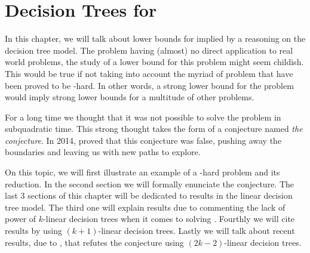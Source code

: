 \chapter{Decision Trees for \threeSUM}

In this chapter, we will talk about lower bounds for \threeSUM implied by
a reasoning on the decision tree model. The \threeSUM problem having (almost) no
direct application to real world problems, the study of a lower bound for this
problem might seem childish. This would be true if not taking into
account the myriad of problem that have been proved to be \threeSUM-hard. In
other words, a strong lower bound for the \threeSUM problem would imply strong
lower bounds for a multitude of other problems.

For a long time we thought that it was not possible to solve the \threeSUM
problem in subquadratic time. This strong thought takes the form of a
conjecture named \emph{the \threeSUM conjecture}. In 2014, \citet*{gronlund:2014}
proved that this conjecture was false, pushing away the
boundaries and leaving us with new paths to explore.

On this topic, we will first illustrate an example of a \threeSUM-hard problem
and its reduction. In the second section we will formally enunciate the
\threeSUM conjecture. The last 3 sections of this chapter will be dedicated to results
in the linear decision tree model. The third one will explain results due to
\citet*{erickson:1999} commenting the lack of power of $k$-linear
decision trees when it comes to solving \ksum. Fourthly we will cite
results by \citet*{ailon:2005} using $(k+1)$-linear decision trees.
Lastly we will talk about recent results, due to \citet*{gronlund:2014}, that
refutes the \threeSUM conjecture using $(2k-2)$-linear decision trees.
